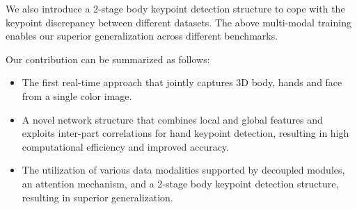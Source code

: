\documentclass[final]{cvpr}
\begin{document}
We also introduce a 2-stage body keypoint detection structure to cope with the keypoint discrepancy between different datasets.
The above multi-modal training enables our superior generalization across different benchmarks.
\par
Our contribution can be summarized as follows:
\begin{itemize}[noitemsep]
\itemsep0em
\item The first real-time approach that jointly captures 3D body, hands and face from a single color image.
\item A novel network structure that combines local and global features and exploits inter-part correlations for hand keypoint detection, resulting in high computational efficiency and improved accuracy.
\item The utilization of various data modalities supported by decoupled modules, an attention mechanism, and a 2-stage body keypoint detection structure, resulting in superior generalization.
\end{itemize}
\end{document}

